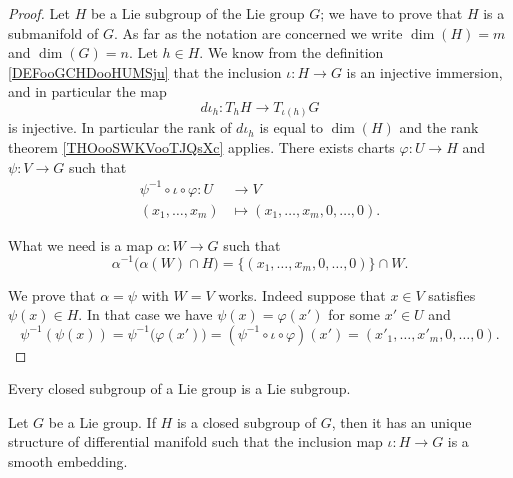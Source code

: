 \begin{proof}
    Let \( H\) be a Lie subgroup of the Lie group \( G\); we have to prove that \( H\) is a submanifold of \( G\). As far as the notation are concerned we write \( \dim(H)=m\) and \( \dim(G)=n\). Let \( h\in H\). We know from the definition \ref{DEFooGCHDooHUMSju} that the inclusion \( \iota\colon H\to G\) is an injective immersion, and in particular the map
    \begin{equation}
        d\iota_h\colon T_hH\to T_{\iota(h)}G
    \end{equation}
    is injective. In particular the rank of \( d\iota_h\) is equal to \( \dim(H)\) and the rank theorem \ref{THOooSWKVooTJQsXc} applies. There exists charts \( \varphi\colon U\to H\) and \( \psi\colon V\to G\) such that
    \begin{equation}
        \begin{aligned}
            \psi^{-1}\circ\iota\circ\varphi\colon U&\to V \\
            (x_1,\ldots, x_m)&\mapsto (x_1,\ldots, x_m,0,\ldots, 0). 
        \end{aligned}
    \end{equation}
    
    What we need is a map \( \alpha\colon W\to G\) such that
    \begin{equation}
        \alpha^{-1}\big( \alpha(W)\cap H \big)=\{ (x_1,\ldots, x_m,0,\ldots, 0) \}\cap W.
    \end{equation}
    
    We prove that \( \alpha=\psi\) with \( W=V\) works. Indeed suppose that \( x\in V\) satisfies \( \psi(x)\in H\). In that case we have \( \psi(x)=\varphi(x')\) for some \( x'\in U\) and
    \begin{equation}
            \psi^{-1}(\psi(x))=\psi^{-1}\big( \varphi(x') \big)=(\psi^{-1}\circ\iota\circ\varphi)(x')=(x'_1,\ldots, x'_m,0,\ldots, 0).
    \end{equation}
\end{proof}

\begin{theorem}     \label{THOooUHCMooCetJgF}
    Every closed subgroup of a Lie group is a Lie subgroup.
\end{theorem}


\begin{theorem}     \label{THOooDEJHooVKJYBL}
    Let \( G\) be a Lie group. If \( H\) is a closed subgroup of \( G\), then it has an unique structure of differential manifold such that the inclusion map \( \iota\colon H\to G\) is a smooth embedding.
\end{theorem}

